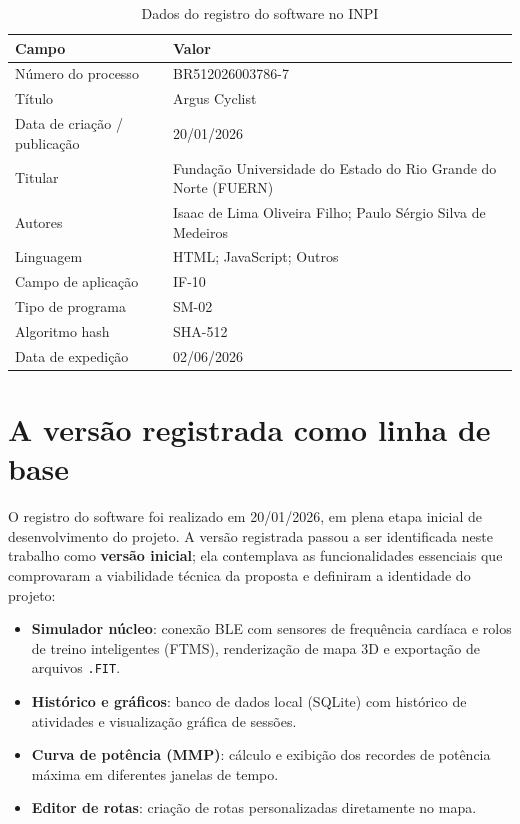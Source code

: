 \begin{table}[h]
    \centering
    \caption{Dados do registro do software no INPI}
    \label{tab:registro}
    \small
    \begin{tabular}{>{\raggedright\arraybackslash}p{4.5cm}p{9cm}}
        \toprule
        \textbf{Campo} & \textbf{Valor} \\
        \midrule
        Número do processo & BR512026003786-7 \\
        Título & Argus Cyclist \\
        Data de criação / publicação & 20/01/2026 \\
        Titular & Fundação Universidade do Estado do Rio Grande do Norte (FUERN) \\
        Autores & Isaac de Lima Oliveira Filho; Paulo Sérgio Silva de Medeiros \\
        Linguagem & HTML; JavaScript; Outros \\
        Campo de aplicação & IF-10 \\
        Tipo de programa & SM-02 \\
        Algoritmo hash & SHA-512 \\
        Data de expedição & 02/06/2026 \\
        \bottomrule
    \end{tabular}
\end{table}

\section{A versão registrada como linha de base}
\label{sec:versao-inicial}

O registro do software foi realizado em 20/01/2026, em plena etapa inicial de
desenvolvimento do projeto. A versão registrada passou a ser identificada neste
trabalho como \textbf{versão inicial}; ela contemplava as funcionalidades
essenciais que comprovaram a viabilidade técnica da proposta e definiram a
identidade do projeto:

\begin{itemize}
    \item \textbf{Simulador núcleo}: conexão BLE com sensores de frequência
        cardíaca e rolos de treino inteligentes (FTMS), renderização de mapa 3D
        e exportação de arquivos \texttt{.FIT}.
    \item \textbf{Histórico e gráficos}: banco de dados local (SQLite) com
        histórico de atividades e visualização gráfica de sessões.
    \item \textbf{Curva de potência (MMP)}: cálculo e exibição dos recordes
        de potência máxima em diferentes janelas de tempo.
    \item \textbf{Editor de rotas}: criação de rotas personalizadas
        diretamente no mapa.
\end{itemize}

